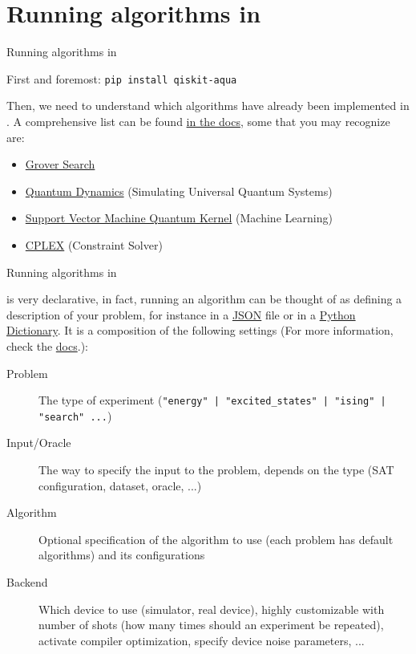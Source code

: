 \documentclass[aspectratio=43]{beamer}
\begin{document}
\section{Running algorithms in \qka}
\begin{frame}{Running algorithms in \qka}
    \begin{card}
        First and foremost: \texttt{pip install qiskit-aqua}
    \end{card}
    \begin{cardTiny}
        Then, we need to understand which algorithms have already been implemented in \qka. A comprehensive list can be found \href{https://qiskit.org/documentation/aqua/algorithms.html}{in the docs}, some that you may recognize are:
        \begin{itemize}
            \item \href{https://qiskit.org/documentation/aqua/algorithms.html#quantum-grover-search}{Grover Search}
            \item \href{https://qiskit.org/documentation/aqua/algorithms.html#quantum-dynamics}{Quantum Dynamics} (Simulating Universal Quantum Systems)
            \item \href{https://qiskit.org/documentation/aqua/algorithms.html#support-vector-machine-quantum-kernel-svm-q-kernel}{Support Vector Machine Quantum Kernel} (Machine Learning)
            \item \href{https://qiskit.org/documentation/aqua/algorithms.html#cplex}{CPLEX} (Constraint Solver)
        \end{itemize}
    \end{cardTiny}
\pagenumber
\end{frame}


\begin{frame}{Running algorithms in \qka}
\small{
    \qka is very declarative, in fact, running an algorithm can be thought of as defining a description of your problem, for instance in a \href{https://www.json.org/}{JSON} file or in a \href{https://docs.python.org/3/tutorial/datastructures.html#dictionaries}{Python Dictionary}. It is a composition of the following settings (For more information, check the \href{https://qiskit.org/documentation/aqua/execution.html#input-file}{docs}.):
    \begin{description}
        \item[Problem] The type of experiment (\texttt{"energy" | "excited_states" | "ising" | "search" ...})
        \item[Input/Oracle] The way to specify the input to the problem, depends on the type (SAT configuration, dataset, oracle, ...)
        \item[Algorithm] Optional specification of the algorithm to use (each problem has default algorithms) and its configurations
        \item[Backend] Which device to use (simulator, real device), highly customizable with number of shots (how many times should an experiment be repeated), activate compiler optimization, specify device noise parameters, ...
    \end{description}
}
\pagenumber
\end{frame}
\end{document}
